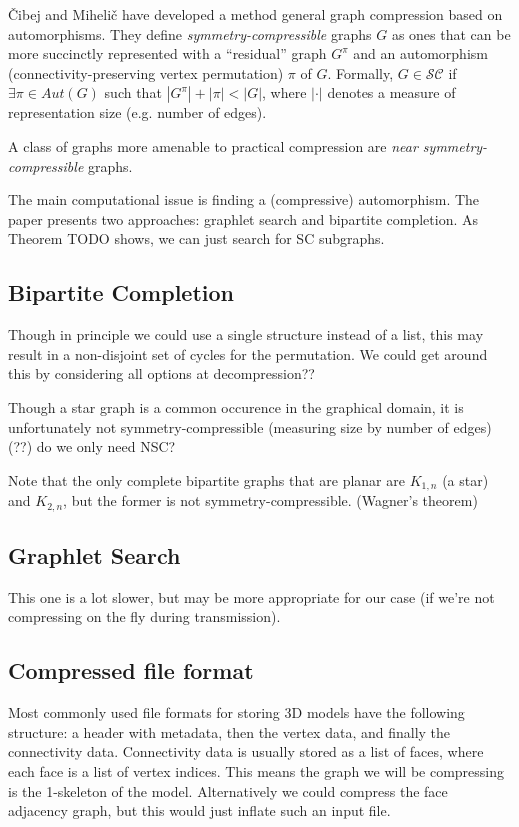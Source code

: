 \documentclass{egpubl}
\begin{document}
Čibej and Mihelič \cite{cibej2021automorphisms} have developed a method general graph compression based on automorphisms. They define
\textit{symmetry-compressible} graphs $G$
as ones that can be more succinctly represented with a ``residual'' graph $G^\pi$ and an automorphism (connectivity-preserving vertex permutation) $\pi$ of $G$.
Formally, $G \in \mathcal{S}\mathcal{C}$ if $\exists \pi \in Aut(G)$ such that $|G^\pi| + |\pi| < |G|$, where $|\cdot|$ denotes a measure of representation size (e.g. number of edges). 

A class of graphs more amenable to practical compression are \textit{near symmetry-compressible} graphs. 


The main computational issue is finding a (compressive) automorphism. The paper presents two approaches: graphlet search and bipartite completion.
As Theorem TODO shows, we can just search for SC subgraphs.

\subsection{Bipartite Completion}

Though in principle we could use a single structure instead of a list, this may result in a non-disjoint set of cycles for the permutation. We could get around this by considering all options at decompression??

Though a star graph is a common occurence in the graphical domain, it is unfortunately not symmetry-compressible (measuring size by number of edges) (??) do we only need NSC?

Note that the only complete bipartite graphs that are planar are $K_{1,n}$ (a star) and $K_{2,n}$, but the former is not symmetry-compressible. (Wagner's theorem)

\subsection{Graphlet Search}
This one is a lot slower, but may be more appropriate for our case (if we're not compressing on the fly during transmission).

\subsection{Compressed file format}
Most commonly used file formats for storing 3D models have the following structure: a header with metadata, then the vertex data, and finally the connectivity data. Connectivity data is usually stored as a list of faces, where each face is a list of vertex indices. This means the graph we will be compressing is the 1-skeleton of the model. Alternatively we could compress the face adjacency graph, but this would just inflate such an input file.
\end{document}
